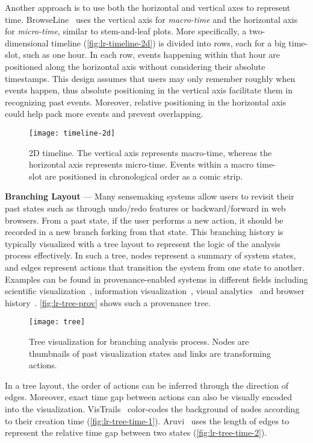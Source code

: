 Another approach is to use both the horizontal and vertical axes to represent time. BrowseLine~\cite{Hoeber2009} uses the vertical axis for \emph{macro-time} and the horizontal axis for \emph{micro-time}, similar to stem-and-leaf plots. More specifically, a two-dimensional timeline (\autoref{fig:lr-timeline-2d}) is divided into rows, each for a big time-slot, such as one hour. In each row, events happening within that hour are positioned along the horizontal axis without considering their absolute timestamps. This design assumes that users may only remember roughly when events happen, thus absolute positioning in the vertical axis facilitate them in recognizing past events. Moreover, relative positioning in the horizontal axis could help pack more events and prevent overlapping.

\begin{figure}[!htb]
	\centering
	\texttt{[image: timeline-2d]}
	\caption{2D timeline. The vertical axis represents macro-time, whereas the horizontal axis represents micro-time. Events within a macro time-slot are positioned in chronological order as a comic strip. }
	\label{fig:lr-timeline-2d}
\end{figure}

\textbf{Branching Layout} --- Many sensemaking systems allow users to revisit their past states such as through undo/redo features or backward/forward in web browsers. From a past state, if the user performs a new action, it should be recorded in a new branch forking from that state. This branching history is typically visualized with a tree layout to represent the logic of the analysis process effectively. In such a tree, nodes represent a summary of system states, and edges represent actions that transition the system from one state
to another. Examples can be found in provenance-enabled systems in different fields including scientific visualization~\cite{Ma1999}, information visualization~\cite{Dunne2012}, visual analytics~\cite{Kadivar2009} and browser history~\cite{Ayers1995}. \autoref{fig:lr-tree-prov} shows such a provenance tree.

\begin{figure}[!htb]
	\centering
	\texttt{[image: tree]}
	\caption{Tree visualization for branching analysis process. Nodes are thumbnails of past visualization states and links are transforming actions. }
	\label{fig:lr-tree-prov}
\end{figure}

In a tree layout, the order of actions can be inferred through the direction of edges. Moreover, exact time gap between actions can also be visually encoded into the visualization. VisTrails~\cite{Bavoil2005} color-codes the background of nodes according to their creation time (\autoref{fig:lr-tree-time-1}). Aruvi~\cite{Shrinivasan2008} uses the length of edges to represent the relative time gap between two states (\autoref{fig:lr-tree-time-2}). 

